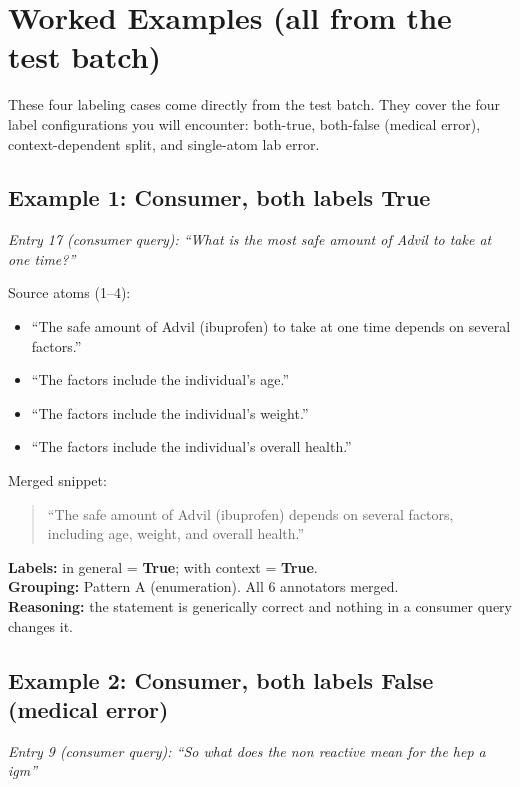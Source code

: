 \documentclass{article}
\begin{document}
\section{Worked Examples (all from the test batch)}
\label{sec:worked-examples}

These four labeling cases come directly from the test batch. They cover the four label configurations you will encounter: both-true, both-false (medical error), context-dependent split, and single-atom lab error.

\subsection*{Example 1: Consumer, both labels True}
\textit{Entry 17 (consumer query): ``What is the most safe amount of Advil to take at one time?''}

\medskip
\noindent Source atoms (1--4):
\begin{itemize}[leftmargin=1.8em,labelsep=0.5em,itemsep=2pt,topsep=3pt]
    \item[\textit{atom 1:}] ``The safe amount of Advil (ibuprofen) to take at one time depends on several factors.''
    \item[\textit{atom 2:}] ``The factors include the individual's age.''
    \item[\textit{atom 3:}] ``The factors include the individual's weight.''
    \item[\textit{atom 4:}] ``The factors include the individual's overall health.''
\end{itemize}

\noindent Merged snippet:
\begin{quote}
``The safe amount of Advil (ibuprofen) depends on several factors, including age, weight, and overall health.''
\end{quote}

\noindent\textbf{Labels:} in general = \textbf{True}; with context = \textbf{True}. \\
\noindent\textbf{Grouping:} Pattern A (enumeration). All 6 annotators merged. \\
\noindent\textbf{Reasoning:} the statement is generically correct and nothing in a consumer query changes it.

\subsection*{Example 2: Consumer, both labels False (medical error)}
\textit{Entry 9 (consumer query): ``So what does the non reactive mean for the hep a igm''}
\end{document}
